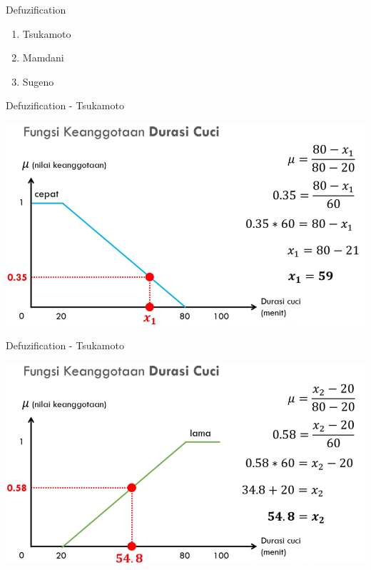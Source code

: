 \documentclass[pdflatex,compress,mathserif]{beamer}
\begin{document}
\begin{frame}{Defuzification}
	\begin{enumerate}
		\item Tsukamoto
		\item Mamdani
		\item Sugeno
	\end{enumerate}
\end{frame}

\begin{frame}{Defuzification - Tsukamoto}
	\begin{center}
		\includegraphics[height=0.8\textheight]{img/39}
	\end{center}
\end{frame}

\begin{frame}{Defuzification - Tsukamoto}
	\begin{center}
		\includegraphics[height=0.8\textheight]{img/40}
	\end{center}
\end{frame}
\end{document}
